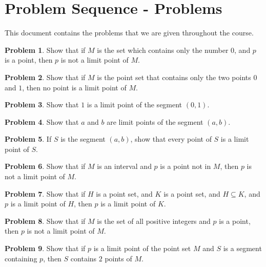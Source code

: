 \documentclass{article}
\theoremstyle{definition}
\newtheorem{problem}{Problem}
\begin{document}
\section*{Problem Sequence - Problems}
This document contains the problems that we are given throughout the course.

\begin{problem}
Show that if $M$ is the set which contains only the number $0$, and $p$ is a point, then $p$ is not a limit point of $M$.
\end{problem}

\begin{problem}
Show that if $M$ is the point set that contains only the two points $0$ and $1$, then no point is a limit point of $M$.
\end{problem}

\begin{problem}
Show that $1$ is a limit point of the segment $(0, 1)$.
\end{problem}

\begin{problem}
Show that $a$ and $b$ are limit points of the segment $(a, b)$.
\end{problem}

\begin{problem}
If $S$ is the segment $(a, b)$, show that every point of $S$ is a limit point of $S$.
\end{problem}

\begin{problem}
Show that if $M$ is an interval and $p$ is a point not in $M$, then $p$ is not a limit point of $M$.
\end{problem}

\begin{problem}
Show that if $H$ is a point set, and $K$ is a point set, and $H \subseteq K$, and $p$ is a limit point of $H$, then $p$ is a limit point of $K$.
\end{problem}

\begin{problem}
Show that if $M$ is the set of all positive integers and $p$ is a point, then $p$ is not a limit point of $M$.
\end{problem}

\begin{problem}
Show that if $p$ is a limit point of the point set $M$ and $S$ is a segment containing $p$, then $S$ contains $2$ points of $M$.
\end{problem}
\end{document}
